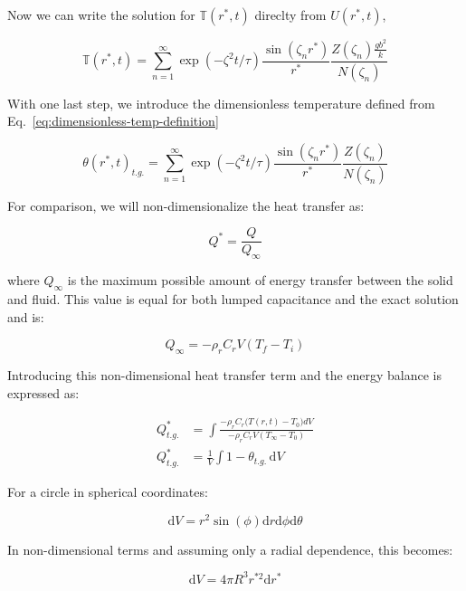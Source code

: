 Now we can write the solution for $\mathbb{T}(r^*,t)$ direclty from $U(r^*,t)$,

\begin{equation}
    \mathbb{T}(r^*,t) = \sum_{n=1}^\infty \exp(-\zeta^2 t/\tau) \frac{\sin(\zeta_n r^*)}{r^*}\frac{Z(\zeta_n)\frac{gb^2}{k}}{N(\zeta_n)}
\end{equation}

With one last step, we introduce the dimensionless temperature defined from Eq.~\ref{eq:dimensionless-temp-definition}

\begin{equation}
    \theta(r^*,t)_{t.g.} = \sum_{n=1}^\infty \exp(-\zeta^2 t/\tau) \frac{\sin(\zeta_n r^*)}{r^*}\frac{Z(\zeta_n)}{N(\zeta_n)}
\end{equation}



For comparison, we will non-dimensionalize the heat transfer as:

\begin{equation}
    Q^*=\frac{Q}{Q_{\infty}}
\end{equation}

where $Q_{\infty}$ is the maximum possible amount of energy transfer between the solid and fluid.  This value is equal for both lumped capacitance and the exact solution and is:

\begin{equation}
    Q_{\infty}=-\rho_rC_rV(T_f - T_i)
\end{equation}

Introducing this non-dimensional heat transfer term and the energy balance is expressed as: 

\begin{align}
    Q^*_{t.g.}&=\int\frac{-\rho_rC_r\big(T(r,t)-T_0\big)dV}{-\rho_rC_rV(T_{\infty}-T_0)}\\
    Q^*_{t.g.}&=\frac{1}{V}\int 1 - \theta_{t.g.} \,\mathrm{d}V
\end{align}


For a circle in spherical coordinates:

\begin{equation}
    \mathrm{d}V=r^2\sin(\phi)\mathrm{d}r\mathrm{d}\phi \mathrm{d}\theta
\end{equation}

In non-dimensional terms and assuming only a radial dependence, this becomes:

\begin{equation}
    \mathrm{d}V=4\pi R^3 r^{*2}\mathrm{d}r^*
\end{equation}

